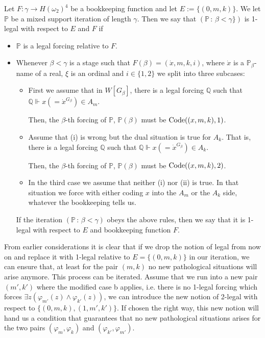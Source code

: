 \documentclass[10pt,a4paper]{amsart}
\newcommand{\forceP}{\mathbb{P}}
\newcommand{\forceQ}{\mathbb{Q}}
\begin{document}
Let $F: \gamma \rightarrow H(\omega_2)^4$ be a bookkeeping function and let $E:=\{ (0,m,k) \}$. We let $\forceP$ be a mixed support iteration of length $ \gamma$. Then we say that $(\forceP  \,  : \, \beta < \gamma\} ) $ is 1-legal with respect to $E$ and $F$ if
\begin{itemize}
\item $\forceP$ is a legal forcing relative to $F$.
\item Whenever $\beta < \gamma$ is a stage such that $F(\beta)=(\dot{x},m,k,i)$, where $\dot{x}$ is a $\forceP_{\beta}$-name of a real, $\xi$ is an ordinal and $i \in \{1,2 \}$ we split into three subcases:
\begin{itemize}
\item[(i)] First we assume that in $W[G_{\beta}]$,
there is a legal forcing $\forceQ$ such that $\forceQ \Vdash x (=\dot{x}^{G_{\beta}}) \in A_m$.

Then, the $\beta$-th forcing of $\forceP$, $\forceP(\beta)$ must be $\hbox{Code} ((x,m,k), 1)$.
\item[(ii)]
Assume that (i) is wrong but the dual situation is true for $A_k$. That is, 
there is a legal forcing $\forceQ$ such that $\forceQ \Vdash x (=\dot{x}^{G_{\beta}}) \in A_k$.


Then, the $\beta$-th forcing of $\forceP$, $\forceP(\beta)$ must be $\hbox{Code} ((x,m,k), 2)$.
\item[(iii)]

In the third case  we assume that neither (i) nor (ii) is true.
In that situation we force with either coding $x$ into the $A_m$ or the $A_k$ side, whatever the bookkeeping tells us.



\end{itemize}

If the iteration  $(\forceP \, : \, \beta < \gamma)$ obeys the above rules, then we say that it is 1-legal with respect to $E$ and bookkeeping function $F$.
\end{itemize}

From earlier considerations it is clear that if we drop the notion of legal from now on and replace it with 1-legal relative to $E=\{ (0,m,k)\}$ in our iteration,  we can ensure that, at least for the pair $(m,k)$ no new pathological situations will arise anymore.
This process can be iterated. Assume that we run into a new pair $(m',k')$ where the modified case b applies, i.e. there is no 1-legal forcing which forces $\exists z (\varphi_{m'}(z) \land\varphi_{k'} (z))$, we can introduce the new notion of 2-legal with respect to $\{(0,m,k) , (1,m',k')\}$. If chosen the right way, this new notion will hand us a condition that guarantees that no new pathological situations arises for the two pairs $(\varphi_m,\varphi_k)$ and $(\varphi_{k'}, \varphi_{m'})$. 
\end{document}
